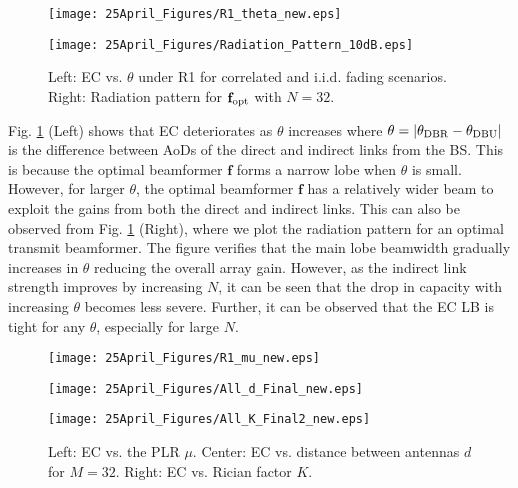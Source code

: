 \documentclass[journal,draftclsnofoot,onecolumn,12pt]{IEEEtran}
\begin{document}
\begin{figure}[ht!]
\centering\vspace{-.4cm}
\begin{minipage}{.4\textwidth}
  \centering
  \texttt{[image: 25April\_Figures/R1\_theta\_new.eps]}
\end{minipage}%
\begin{minipage}{.4\textwidth}
  \centering
  \texttt{[image: 25April\_Figures/Radiation\_Pattern\_10dB.eps]}
\end{minipage}\vspace{-.2cm}
\caption{Left: EC vs. $\theta$ under R1 for correlated and {\rm i.i.d.} fading scenarios. Right: Radiation pattern for $\mathbf{f}_{\rm opt}$ with $N = 32$.}\vspace{-.6cm}
\label{Fig3}
\end{figure}

Fig. \ref{Fig3} (Left) shows that EC deteriorates  as $\theta$ increases where $\theta = |\theta_{\rm{DBR}} - \theta_{\rm{DBU}}|$ is the difference between AoDs of the direct and indirect links from the BS. This is because the optimal beamformer $\mathbf{f}$ forms a narrow lobe when $\theta$ is small. However, for larger $\theta$, the optimal beamformer $\mathbf{f}$ has a relatively wider beam %
to exploit the gains from both the direct and indirect links. This can also be observed from Fig. \ref{Fig3} (Right), where we plot the radiation pattern for an optimal transmit beamformer. The figure verifies that the main lobe beamwidth gradually increases in $\theta$ reducing the overall array gain. However, as the indirect link strength improves by increasing $N$, it can be seen that the drop in capacity with increasing $\theta$ becomes less severe. Further, it can  be observed that the EC LB is tight for any $\theta$, especially for large $N$. 
\begin{figure}[ht!]
\centering\vspace{-.4cm}
\begin{minipage}{.33\textwidth}
  \centering
  \texttt{[image: 25April\_Figures/R1\_mu\_new.eps]}
\end{minipage}%
\begin{minipage}{.33\textwidth}
  \centering
  \texttt{[image: 25April\_Figures/All\_d\_Final\_new.eps]}
\end{minipage}\vspace{-.3cm}
\begin{minipage}{.33\textwidth}
  \centering
  \texttt{[image: 25April\_Figures/All\_K\_Final2\_new.eps]}
\end{minipage}
\caption{Left: EC vs. the PLR $\mu$. Center: EC vs. distance between antennas $d$ for $M = 32$. Right: EC vs. Rician factor $K$.}\vspace{-.6cm}
\label{Fig4}
\end{figure}
\end{document}
